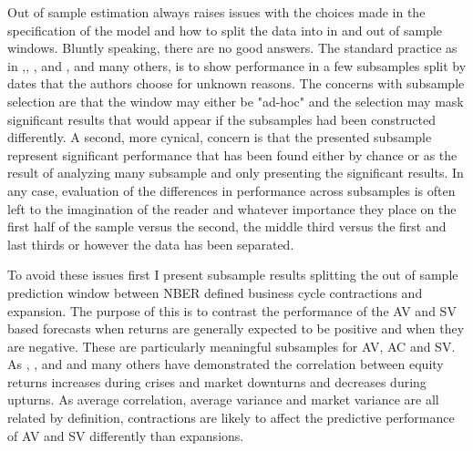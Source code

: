 Out of sample estimation always raises issues with the choices made in the specification of the model and how to split the data into in and out of sample windows. 
Bluntly speaking, there are no good answers. The standard practice as in \citet{Rapach2013},\citet{Rapach2010}, \citet{Rapach2016}, and \cite{Huang2015}, and many others, is to show performance in a few subsamples split by dates that the authors choose for unknown reasons. The concerns with subsample selection are that the window may either be "ad-hoc" and the selection may mask significant results that would appear if the subsamples had been constructed differently. A second, more cynical, concern is that the presented subsample represent significant performance that has been found either by chance or as the result of analyzing many subsample and only presenting the significant results. In any case, evaluation of the differences in performance across subsamples is often left to the imagination of the reader and whatever importance they place on the first half of the sample versus the second, the middle third versus the first and last thirds or however the data has been separated. 

To avoid these issues first I present subsample results splitting the out of sample prediction window between NBER defined business cycle contractions and expansion. The purpose of this is to contrast the performance of the AV and SV based forecasts when returns are generally expected to be positive and when they are negative. These are particularly meaningful subsamples for AV, AC and SV. As \citet{Forbes_2002}, \citet{Hartmand_2004}, and \citet{ANG2002443} and many others have demonstrated the correlation between equity returns increases during crises and market downturns and decreases during upturns. As average correlation, average variance and market variance are all related by definition, contractions are likely to affect the predictive performance of AV and SV differently than expansions.

